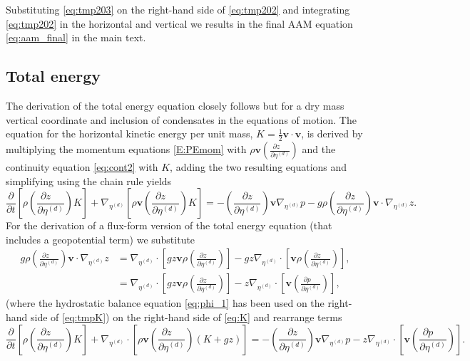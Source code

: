 \documentclass{agujournal}
\begin{document}
Substituting \eqref{eq:tmp203} on the right-hand side of \eqref{eq:tmp202} and integrating \eqref{eq:tmp202} in the horizontal and vertical we results in the final AAM equation \eqref{eq:aam_final} in the main text.
\subsection{Total energy}
The derivation of the total energy equation closely follows \citet{K1974MWR} but for a dry mass vertical coordinate and inclusion of condensates in the equations of motion. The equation for the horizontal kinetic energy per unit mass, $K=\frac{1}{2}\mathbf{v}\cdot \mathbf{v}$, is derived by multiplying the momentum equations \eqref{E:PEmom} with $\rho \mathbf{v} \left( \frac{\partial z\quad }{\partial \eta^{(d)}}\right)$ and the continuity equation \eqref{eq:cont2} with $K$, adding the two resulting equations and simplifying using the chain rule yields
\begin{equation}
\frac{\partial }{\partial t}\left[ \rho \left( \frac{\partial z\quad }{\partial \eta^{(d)}}\right)K\right]+\nabla_{\eta^{(d)}} \left[ \rho \mathbf{v} \left( \frac{\partial z\quad }{\partial \eta^{(d)}}\right)K\right]=-\left( \frac{\partial z}{\partial \eta^{(d)}}\right)\mathbf{v} \nabla_{\eta^{(d)}}p-g\rho \left( \frac{\partial z}{\partial \eta^{(d)}}\right)\mathbf{v} \cdot \nabla_{\eta^{(d)}}z.\label{eq:K}
\end{equation}
For the derivation of a flux-form version of the total energy equation (that includes a geopotential term) we substitute
\begin{align}
g \rho \left( \frac{\partial z\quad }{\partial \eta^{(d)}}\right) \mathbf{v} \cdot \nabla_{\eta^{(d)}} z &= \nabla_{\eta^{(d)}}\cdot \left[ gz\mathbf{v}\rho  \left( \frac{\partial z\quad }{\partial \eta^{(d)}}\right) \right] - gz \nabla_{\eta^{(d)}} \cdot \left[ \mathbf{v}\rho  \left( \frac{\partial z\quad }{\partial \eta^{(d)}}\right) \right],\\
&=\nabla_{\eta^{(d)}}\cdot \left[ g z\mathbf{v}\rho  \left( \frac{\partial z\quad }{\partial \eta^{(d)}}\right) \right] -z \nabla_{\eta^{(d)}}\cdot \left[ \mathbf{v} \left( \frac{\partial p\quad }{\partial \eta^{(d)}}\right)\right],\label{eq:tmpK}
\end{align}
(where the hydrostatic balance equation \eqref{eq:phi_1} has been used on the right-hand side of \eqref{eq:tmpK}) on the right-hand side of \eqref{eq:K} and rearrange terms
\begin{equation}
\frac{\partial }{\partial t}\left[ \rho \left( \frac{\partial z\quad }{\partial \eta^{(d)}}\right)K\right]+\nabla_{\eta^{(d)}} \cdot \left[ \rho \mathbf{v} \left( \frac{\partial z\quad }{\partial \eta^{(d)}}\right) \left( K+gz \right) \right]=-\left( \frac{\partial z}{\partial \eta^{(d)}}\right)\mathbf{v} \nabla_{\eta^{(d)}}p - z \nabla_{\eta^{(d)}}\cdot \left[ \mathbf{v} \left( \frac{\partial p\quad }{\partial \eta^{(d)}}\right)\right].\label{eq:tmp1}
\end{equation}
\end{document}

